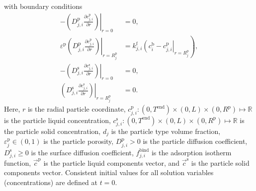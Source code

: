 \documentclass{article}
\begin{document}
with boundary conditions
\begin{align}
- \left. \left( D^{\mathrm{p}}_{j,i} \frac{\partial c^{\mathrm{p}}_{j,i}}{\partial r} \right) \right|_{r=0}
&= 0, \\
\varepsilon^{\mathrm{p}} \left. \left( D^{\mathrm{p}}_{j,i} \frac{\partial c^{\mathrm{p}}_{j,i}}{\partial r} \right)\right|_{r = R^{\mathrm{p}}_{j}}
               &= k^{\mathrm{f}}_{j,i} \left. \left( c^{\mathrm{b}}_i - c^{\mathrm{p}}_{j,i} \right|_{r = R^{\mathrm{p}}_{j}} \right),\\
-\left( \left. D^{\mathrm{s}}_{j,i} \frac{\partial c^{\mathrm{s}}_{j,i}}{\partial r} \right) \right|_{r=0}
&= 0, \\
\left( \left. D^{\mathrm{s}}_{j,i} \frac{\partial c^{\mathrm{s}}_{j,i}}{\partial r} \right) \right|_{r = R^{\mathrm{p}}_{j}}
&= 0.
\end{align}
Here, $r$ is the radial particle coordinate, $c^{\mathrm{p}}_{j,i}\colon (0, T^\mathrm{end}) \times (0, L)\times (0, R^{\mathrm{p}}) \mapsto \mathbb{R}$ is the particle liquid concentration, $c^{\mathrm{s}}_{j,i}\colon (0, T^\mathrm{end}) \times (0, L)\times (0, R^{\mathrm{p}}) \mapsto \mathbb{R}$ is the particle solid concentration, $d_j$ is the particle type volume fraction, $\varepsilon^{\mathrm{p}}_{j}\in (0, 1)$ is the particle porosity, $D^\mathrm{p}_{j,i}> 0$ is the particle diffusion coefficient, $D^\mathrm{s}_{j,i}\geq 0$ is the surface diffusion coefficient, $f^\mathrm{bind}_{j,i}$ is the adsorption isotherm function, $\vec{c}^\mathrm{p}$ is the particle liquid components vector, and $\vec{c}^\mathrm{s}$ is the particle solid components vector.
Consistent initial values for all solution variables (concentrations) are defined at $t = 0$.
\end{document}
